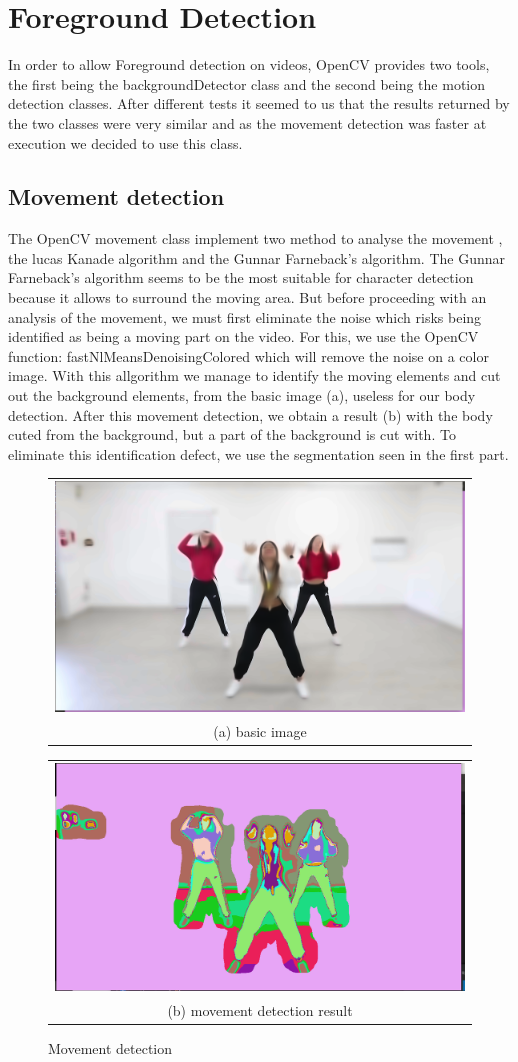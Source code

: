 \documentclass[conference]{IEEEtran}
\begin{document}
\section{Foreground Detection}

In order to allow Foreground detection on videos, OpenCV provides two tools, the first being the backgroundDetector class and the second being the motion detection classes. After different tests it seemed to us that the results returned by the two classes were very similar and as the movement detection was faster at execution we decided to use this class.

\subsection{Movement detection}
 
The OpenCV movement class implement two method to analyse the movement , the lucas Kanade algorithm and the Gunnar Farneback’s algorithm. The Gunnar Farneback’s algorithm seems to be the most suitable for character detection because it allows to surround the moving area. But before proceeding with an analysis of the movement, we must first eliminate the noise which risks being identified as being a moving part on the video. For this, we use the OpenCV function: fastNlMeansDenoisingColored which will remove the noise on a color image.
With this allgorithm we manage to identify the moving elements and cut out the background elements, from the basic image (a), useless for our body detection.
After this movement detection, we obtain a result (b)  with the body cuted from the background, but a part of the background is cut with. To eliminate this identification defect, we use the segmentation seen in the first part.

\begin{figure}[h!]
  \centering
  \begin{tabular}{@{}c@{}}
    \includegraphics[width=0.4\linewidth]{fig5.png} \\[\abovecaptionskip]
    \small (a) basic image
  \end{tabular}
  \begin{tabular}{@{}c@{}}
    \includegraphics[width=0.4\linewidth]{fig6.png} \\[\abovecaptionskip]
    \small (b) movement detection result
  \end{tabular}
  \caption{Movement detection}
  \label{fig 3}
\end{figure}
\end{document}
